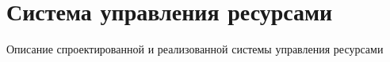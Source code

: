 \section{Система управления ресурсами}

Описание спроектированной и реализованной системы управления ресурсами



